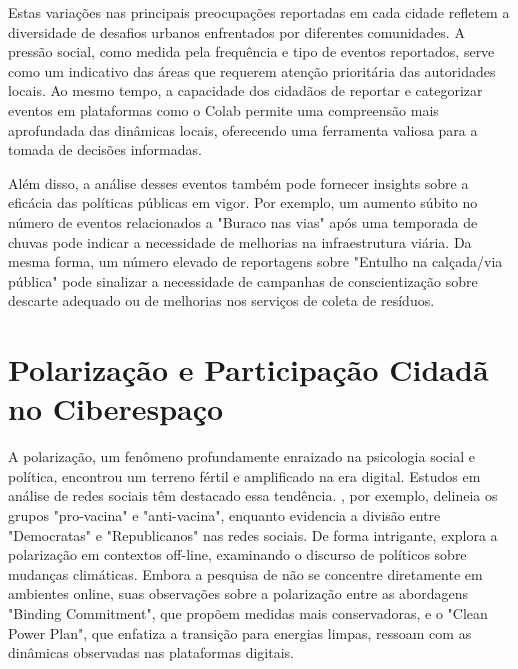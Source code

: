 Estas variações nas principais preocupações reportadas em cada cidade refletem a diversidade de desafios urbanos enfrentados por diferentes comunidades. A pressão social, como medida pela frequência e tipo de eventos reportados, serve como um indicativo das áreas que requerem atenção prioritária das autoridades locais. Ao mesmo tempo, a capacidade dos cidadãos de reportar e categorizar eventos em plataformas como o Colab permite uma compreensão mais aprofundada das dinâmicas locais, oferecendo uma ferramenta valiosa para a tomada de decisões informadas.

Além disso, a análise desses eventos também pode fornecer insights sobre a eficácia das políticas públicas em vigor. Por exemplo, um aumento súbito no número de eventos relacionados a "Buraco nas vias" após uma temporada de chuvas pode indicar a necessidade de melhorias na infraestrutura viária. Da mesma forma, um número elevado de reportagens sobre "Entulho na calçada/via pública" pode sinalizar a necessidade de campanhas de conscientização sobre descarte adequado ou de melhorias nos serviços de coleta de resíduos.

\section{Polarização e Participação Cidadã no Ciberespaço}

A polarização, um fenômeno profundamente enraizado na psicologia social e política, encontrou um terreno fértil e amplificado na era digital. Estudos em análise de redes sociais têm destacado essa tendência. , por exemplo, delineia os grupos "pro-vacina" e "anti-vacina", enquanto  evidencia a divisão entre "Democratas" e "Republicanos" nas redes sociais. De forma intrigante,  explora a polarização em contextos off-line, examinando o discurso de políticos sobre mudanças climáticas. Embora a pesquisa de  não se concentre diretamente em ambientes online, suas observações sobre a polarização entre as abordagens "Binding Commitment", que propõem medidas mais conservadoras, e o "Clean Power Plan", que enfatiza a transição para energias limpas, ressoam com as dinâmicas observadas nas plataformas digitais.

